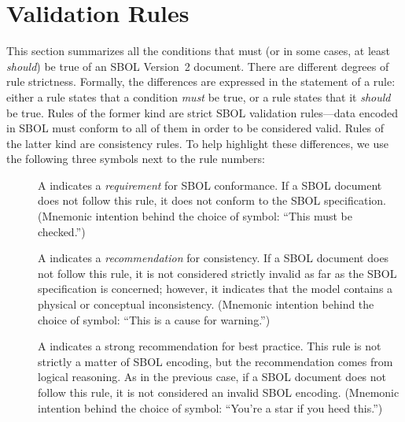 \newcommand{\printValid}{\validRule{sbol-\arabic{sbolCtr}\addtocounter{sbolCtr}{1}}}
\newcommand{\printModeling}{\modelingRule{sbol-\arabic{sbolCtr}\addtocounter{sbolCtr}{1}}}

\section{Validation Rules}
\label{validation}


This section summarizes all the conditions that must (or in some cases,
at least \emph{should}) be true of an SBOL Version~2 document.  
There are different degrees of rule strictness.  Formally, the differences are expressed in the statement of a rule: either a rule states that a condition \emph{must} be true, or a rule states that it \emph{should} be true.  Rules of the former kind are strict SBOL validation rules---data encoded in SBOL must conform to
all of them in order to be considered valid.  Rules of the latter kind
are consistency rules.  To help highlight these differences, we use the
following three symbols next to the rule numbers:

\begin{description}

\item[\hspace*{6.5pt}\vSymbol\vsp] A \vSymbolName indicates a
  \emph{requirement} for SBOL conformance. If a SBOL document does not follow this rule, it does not conform to the SBOL
  specification.  (Mnemonic intention behind the choice of symbol:
  ``This must be checked.'')

\item[\hspace*{6.5pt}\cSymbol\csp] A \cSymbolName indicates a
  \emph{recommendation} for consistency.  If a SBOL document does not
  follow this rule, it is not considered strictly invalid as far as the
  SBOL specification is concerned; however, it indicates that the model contains a physical or conceptual inconsistency.  (Mnemonic intention behind the choice of symbol:
  ``This is a cause for warning.'')

\item[\hspace*{6.5pt}\mSymbol\msp] A \mSymbolName indicates a strong
  recommendation for best practice.  This rule is not strictly
  a matter of SBOL encoding, but the recommendation comes from logical
  reasoning.  As in the previous case, if a SBOL document does not follow this rule, it is not considered an invalid SBOL encoding.  (Mnemonic intention behind the choice of symbol: ``You're a star if you heed this.'')

\end{description}

